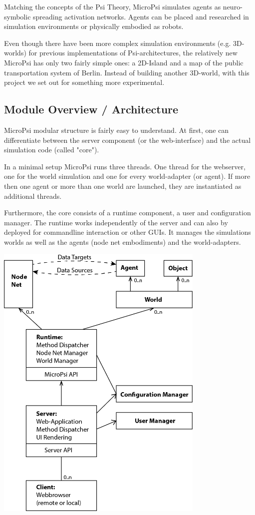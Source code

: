 Matching the concepts of the Psi Theory, MicroPsi simulates agents as neuro-symbolic spreading activation networks. Agents can be placed and researched in simulation environments or physically embodied as robots.~\cite{conf/agi/Bach12}
        
Even though there have been more complex simulation environments (e.g. 3D-worlds) for previous implementations of Psi-architectures, the relatively new MicroPsi has only two fairly simple ones: a 2D-Island and a map of the public transportation system of Berlin. Instead of building another 3D-world, with this project we set out for something more experimental.

        \subsection{Module Overview / Architecture}
MicroPsi modular structure is fairly easy to understand. At first, one can differentiate between the server component (or the web-interface) and the actual simulation code (called "core").

In a minimal setup MicroPsi runs three threads. One thread for the webserver, one for the world simulation and one for every world-adapter (or agent). If more then one agent or more than one world are launched, they are instantiated as additional threads.

Furthermore, the core consists of a runtime component, a user and configuration manager. The runtime works independently of the server and can also by deployed for commandline interaction or other GUIs. It manages the simulations worlds as well as the agents (node net embodiments) and the world-adapters.~\cite{conf/agi/Bach12}

            \includegraphics[width=10cm]{graphics/micropsi2_uml}
            
